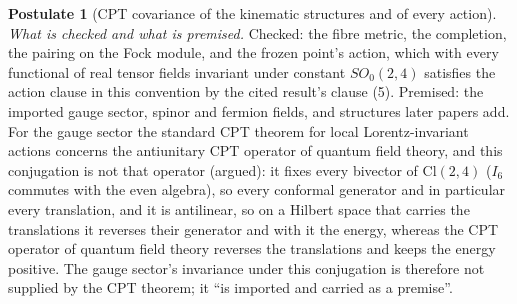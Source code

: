 \documentclass[11pt]{article}
\theoremstyle{definition}
\newtheorem{postulate}[theorem]{Postulate}
\theoremstyle{plain}
\providecommand{\Cl}{}\renewcommand{\Cl}{\mathrm{Cl}}
\begin{document}
\begin{postulate}[CPT covariance of the kinematic structures and of every action]
\emph{What is checked and what is premised.} Checked: the fibre metric, the completion, the pairing on the Fock module, and the frozen point's action, which with every functional of real tensor fields invariant under constant $SO_{0}(2,4)$ satisfies the action clause in this convention by the cited result's clause (5). Premised: the imported gauge sector, spinor and fermion fields, and structures later papers add. For the gauge sector the standard CPT theorem for local Lorentz-invariant actions concerns the antiunitary CPT operator of quantum field theory, and this conjugation is not that operator (argued): it fixes every bivector of $\Cl(2,4)$ ($I_{6}$ commutes with the even algebra), so every conformal generator and in particular every translation, and it is antilinear, so on a Hilbert space that carries the translations it reverses their generator and with it the energy, whereas the CPT operator of quantum field theory reverses the translations and keeps the energy positive. The gauge sector's invariance under this conjugation is therefore not supplied by the CPT theorem; it ``is imported and carried as a premise''.
\end{postulate}
\end{document}
